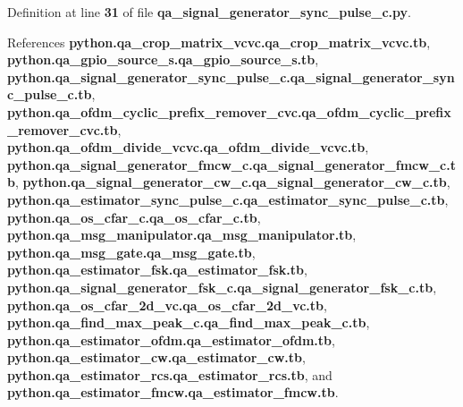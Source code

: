 Definition at line {\bf 31} of file {\bf qa\+\_\+signal\+\_\+generator\+\_\+sync\+\_\+pulse\+\_\+c.\+py}.



References {\bf python.\+qa\+\_\+crop\+\_\+matrix\+\_\+vcvc.\+qa\+\_\+crop\+\_\+matrix\+\_\+vcvc.\+tb}, {\bf python.\+qa\+\_\+gpio\+\_\+source\+\_\+s.\+qa\+\_\+gpio\+\_\+source\+\_\+s.\+tb}, {\bf python.\+qa\+\_\+signal\+\_\+generator\+\_\+sync\+\_\+pulse\+\_\+c.\+qa\+\_\+signal\+\_\+generator\+\_\+sync\+\_\+pulse\+\_\+c.\+tb}, {\bf python.\+qa\+\_\+ofdm\+\_\+cyclic\+\_\+prefix\+\_\+remover\+\_\+cvc.\+qa\+\_\+ofdm\+\_\+cyclic\+\_\+prefix\+\_\+remover\+\_\+cvc.\+tb}, {\bf python.\+qa\+\_\+ofdm\+\_\+divide\+\_\+vcvc.\+qa\+\_\+ofdm\+\_\+divide\+\_\+vcvc.\+tb}, {\bf python.\+qa\+\_\+signal\+\_\+generator\+\_\+fmcw\+\_\+c.\+qa\+\_\+signal\+\_\+generator\+\_\+fmcw\+\_\+c.\+tb}, {\bf python.\+qa\+\_\+signal\+\_\+generator\+\_\+cw\+\_\+c.\+qa\+\_\+signal\+\_\+generator\+\_\+cw\+\_\+c.\+tb}, {\bf python.\+qa\+\_\+estimator\+\_\+sync\+\_\+pulse\+\_\+c.\+qa\+\_\+estimator\+\_\+sync\+\_\+pulse\+\_\+c.\+tb}, {\bf python.\+qa\+\_\+os\+\_\+cfar\+\_\+c.\+qa\+\_\+os\+\_\+cfar\+\_\+c.\+tb}, {\bf python.\+qa\+\_\+msg\+\_\+manipulator.\+qa\+\_\+msg\+\_\+manipulator.\+tb}, {\bf python.\+qa\+\_\+msg\+\_\+gate.\+qa\+\_\+msg\+\_\+gate.\+tb}, {\bf python.\+qa\+\_\+estimator\+\_\+fsk.\+qa\+\_\+estimator\+\_\+fsk.\+tb}, {\bf python.\+qa\+\_\+signal\+\_\+generator\+\_\+fsk\+\_\+c.\+qa\+\_\+signal\+\_\+generator\+\_\+fsk\+\_\+c.\+tb}, {\bf python.\+qa\+\_\+os\+\_\+cfar\+\_\+2d\+\_\+vc.\+qa\+\_\+os\+\_\+cfar\+\_\+2d\+\_\+vc.\+tb}, {\bf python.\+qa\+\_\+find\+\_\+max\+\_\+peak\+\_\+c.\+qa\+\_\+find\+\_\+max\+\_\+peak\+\_\+c.\+tb}, {\bf python.\+qa\+\_\+estimator\+\_\+ofdm.\+qa\+\_\+estimator\+\_\+ofdm.\+tb}, {\bf python.\+qa\+\_\+estimator\+\_\+cw.\+qa\+\_\+estimator\+\_\+cw.\+tb}, {\bf python.\+qa\+\_\+estimator\+\_\+rcs.\+qa\+\_\+estimator\+\_\+rcs.\+tb}, and {\bf python.\+qa\+\_\+estimator\+\_\+fmcw.\+qa\+\_\+estimator\+\_\+fmcw.\+tb}.

